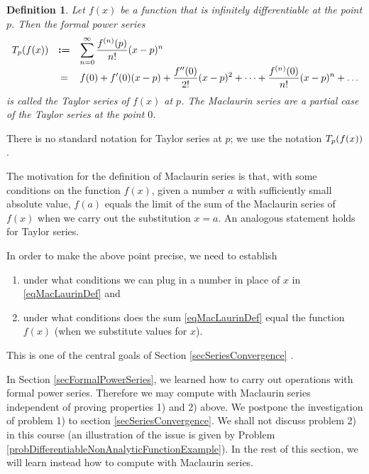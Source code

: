 \documentclass[12pt]{book}
\newcommand{\eqdef}{\textbf{:=}}
\newtheorem{definition}[theorem]{Definition}
\begin{document}
\begin{definition}\label{defTaylorSeries}
 Let $f(x)$ be a function that is infinitely differentiable at the point $p$. Then the formal power series
\begin{equation}\label{eqTaylorDef}
\begin{array}{rcl}
\taylor_p (f(x))&\eqdef&\displaystyle \sum_{n=0}^{\infty}  \frac{f^{(n)} (p) }{ n!} (x-p)^n\\&=& \displaystyle f(0)+f'(0)(x-p)+\frac{f''(0)}{2!}(x-p)^2 +\dots+ \frac{f^{(n)}(0)}{n!}(x-p)^n+\dots
\end{array}
\end{equation}
is called the Taylor series of $f(x)$ at $p$. The Maclaurin series are a partial case of the Taylor series at the point $0$.
\end{definition}
There is no standard notation for Taylor series at $p$; we use the notation ${\normalfont{T}}_p(f(x))$.

The motivation for the definition of Maclaurin series is that, with some conditions on the function $f(x)$, given a number $a$ with sufficiently small absolute value, $f(a)$ equals the limit of the sum of the Maclaurin series of $f(x)$ when we carry out the substitution $x=a$. An analogous statement holds for Taylor series.

In order to make the above point precise, we need to establish
\begin{enumerate}
\item under what conditions we can plug in a number in place of $x$ in \eqref{eqMacLaurinDef} and
\item under what conditions does the sum \eqref{eqMacLaurinDef} equal the function $f(x)$ (when we substitute values for $x$).
\end{enumerate}
This is one of the central goals of Section \ref{secSeriesConvergence} .

In Section \ref{secFormalPowerSeries}, we learned how to carry out operations with formal power series. Therefore we may compute with Maclaurin series independent of proving properties 1) and 2) above. We postpone the investigation of problem 1)  to section \ref{secSeriesConvergence}. We shall not discuss problem 2) in this course (an illustration of the issue is given by Problem \ref{probDifferentiableNonAnalyticFunctionExample}). In the rest of this section, we will learn instead how to compute with Maclaurin series.
\end{document}

